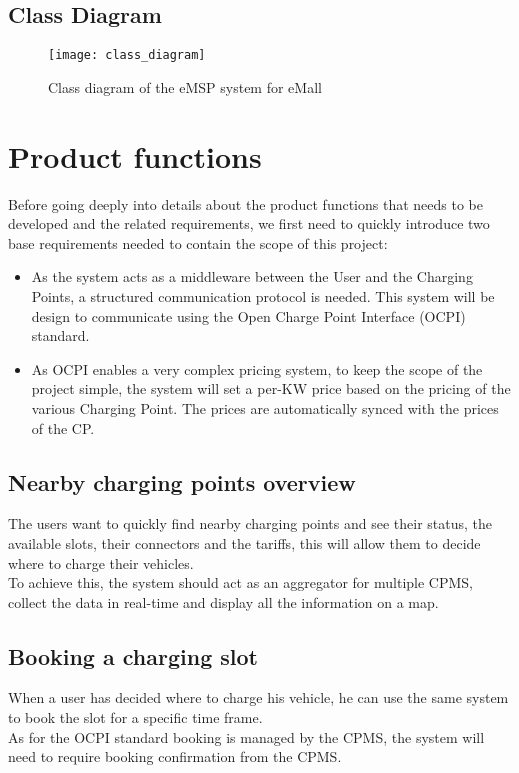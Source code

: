 \newpage

\subsection{Class Diagram}

\begin{figure}[h]
\centering
\texttt{[image: class\_diagram]}
\caption{Class diagram of the eMSP system for eMall}
\end{figure}

\clearpage
\newpage


\section{Product functions}
Before going deeply into details about the product functions that needs to be developed and the related requirements, we first need to quickly introduce two base requirements needed to contain the scope of this project:\\

\begin{itemize}
	\item As the system acts as a middleware between the User and the Charging Points, a structured communication protocol is needed. This system will be design to communicate using the Open Charge Point Interface (OCPI) standard.
	\item As OCPI enables a very complex pricing system, to keep the scope of the project simple, the system will set a per-KW price based on the pricing of the various Charging Point. The prices are automatically synced with the prices of the CP.
\end{itemize}

\subsection{Nearby charging points overview}
The users want to quickly find nearby charging points and see their status, the available slots, their connectors and the tariffs, this will allow them to decide where to charge their vehicles.\\
To achieve this, the system should act as an aggregator for multiple CPMS, collect the data in real-time and display all the information on a map.

\subsection{Booking a charging slot}
When a user has decided where to charge his vehicle, he can use the same system to book the slot for a specific time frame.\\
As for the OCPI standard booking is managed by the CPMS, the system will need to require booking confirmation from the CPMS.

